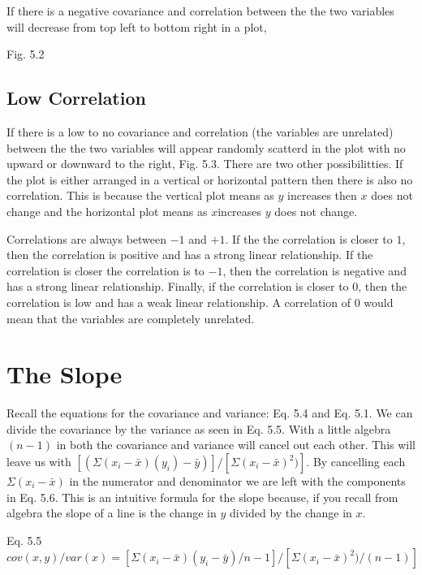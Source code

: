 \documentclass[]{book}
\theoremstyle{definition}
\theoremstyle{definition}
\theoremstyle{definition}
\theoremstyle{remark}
\begin{document}
If there is a negative covariance and correlation between the the two
variables will decrease from top left to bottom right in a plot,

Fig. 5.2

\hypertarget{low-correlation}{%
\subsection{Low Correlation}\label{low-correlation}}

If there is a low to no covariance and correlation (the variables are
unrelated) between the the two variables will appear randomly scatterd
in the plot with no upward or downward to the right, Fig. 5.3. There are
two other possibilitties. If the plot is either arranged in a vertical
or horizontal pattern then there is also no correlation. This is because
the vertical plot means as \(y\) increases then \(x\) does not change
and the horizontal plot means as \(x\)increases \(y\) does not change.

Correlations are always between \(-1\) and \(+1\). If the the
correlation is closer to \(1\), then the correlation is positive and has
a strong linear relationship. If the correlation is closer the
correlation is to \(-1\), then the correlation is negative and has a
strong linear relationship. Finally, if the correlation is closer to
\(0\), then the correlation is low and has a weak linear relationship. A
correlation of \(0\) would mean that the variables are completely
unrelated.

\hypertarget{the-slope}{%
\section{The Slope}\label{the-slope}}

Recall the equations for the covariance and variance: Eq. 5.4 and Eq.
5.1. We can divide the covariance by the variance as seen in Eq. 5.5.
With a little algebra \((n-1)\) in both the covariance and variance will
cancel out each other. This will leave us with
\([(\Sigma(x_{i} - \bar{x})(y_{i}) - \bar{y})]/[\Sigma(x_{i} - \bar{x})^2)]\).
By cancelling each \(\Sigma(x_{i} - \bar{x})\) in the numerator and
denominator we are left with the components in Eq. 5.6. This is an
intuitive formula for the slope because, if you recall from algebra the
slope of a line is the change in \(y\) divided by the change in \(x\).

Eq. 5.5
\(cov(x,y)/var(x)=[\Sigma(x_{i} - \bar{x})(y_{i} - \bar{y})/n-1]/[\Sigma(x_{i} - \bar{x})^2)/(n-1)]\)
\end{document}

